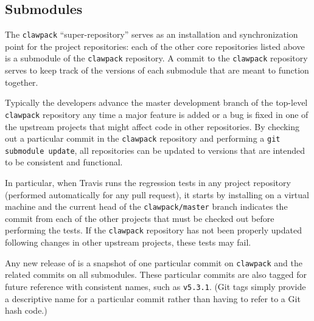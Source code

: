 \subsection{Submodules}

The \texttt{clawpack} ``super-repository'' serves as an
installation and synchronization point for the project repositories:
each of the other core \clawpack repositories listed above is a submodule
of the \texttt{clawpack} repository.  A commit to the \texttt{clawpack}
repository serves to keep track of the
versions of each submodule that are meant to function together.

Typically the \clawpack developers advance the master development
branch of the top-level \texttt{clawpack}
repository any time a major feature is added
or a bug is fixed in one of the upstream projects that might affect code in
other repositories.  By checking out a particular commit in the
\texttt{clawpack} repository and performing a \texttt{git submodule update},
all repositories can be updated to versions that are intended to be
consistent and functional.

In particular, when Travis runs the regression tests in any project
repository (performed automatically for any pull request), it starts
by installing \clawpack on a virtual machine and the current head
of the \texttt{clawpack/master} branch indicates the commit from each of the
other projects that must be checked out before performing the tests.
If the \texttt{clawpack} repository has not been properly updated
following changes in other upstream projects, these tests may fail.

Any new release of \clawpack is a snapshot of one particular commit on
\texttt{clawpack} and the related commits on all submodules.  These
particular commits are also tagged for future reference with consistent
names, such as \texttt{v5.3.1}.  (Git tags simply provide a descriptive name
for a particular commit rather than having to refer to a Git hash code.)


